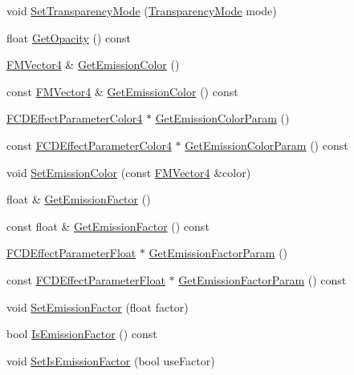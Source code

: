 \begin{DoxyCompactItemize}
\item 
void \hyperlink{classFCDEffectStandard_a486d7ddb1801ed110c40b7b8ece29794}{SetTransparencyMode} (\hyperlink{classFCDEffectStandard_a9e749ea44e9152c5671985b3e9a7c9a5}{TransparencyMode} mode)
\item 
float \hyperlink{classFCDEffectStandard_ae10a18d9f1c10bfd334bb914b6c664e4}{GetOpacity} () const 
\item 
\hyperlink{classFMVector4}{FMVector4} \& \hyperlink{classFCDEffectStandard_a5995a932d71c056adf95c3ac21568d52}{GetEmissionColor} ()
\item 
const \hyperlink{classFMVector4}{FMVector4} \& \hyperlink{classFCDEffectStandard_aed08c475e5e46cfc37bfe25127b9b299}{GetEmissionColor} () const 
\item 
\hyperlink{classFCDEffectParameterAnimatableT}{FCDEffectParameterColor4} $\ast$ \hyperlink{classFCDEffectStandard_ad302349aad357e6c6335e794bc583ae0}{GetEmissionColorParam} ()
\item 
const \hyperlink{classFCDEffectParameterAnimatableT}{FCDEffectParameterColor4} $\ast$ \hyperlink{classFCDEffectStandard_ae104c6a2552283803cb7642fc9a9793d}{GetEmissionColorParam} () const 
\item 
void \hyperlink{classFCDEffectStandard_a7c0cf1aef71af0350675d32a3b179b4b}{SetEmissionColor} (const \hyperlink{classFMVector4}{FMVector4} \&color)
\item 
float \& \hyperlink{classFCDEffectStandard_aa0c497d8985dfd39f9a0b31ce0e61d90}{GetEmissionFactor} ()
\item 
const float \& \hyperlink{classFCDEffectStandard_aa8b817f9737206608e87ef4ea1f9c3f8}{GetEmissionFactor} () const 
\item 
\hyperlink{classFCDEffectParameterAnimatableT}{FCDEffectParameterFloat} $\ast$ \hyperlink{classFCDEffectStandard_a0c99ef6f5a48cabe5ad756002b2b5292}{GetEmissionFactorParam} ()
\item 
const \hyperlink{classFCDEffectParameterAnimatableT}{FCDEffectParameterFloat} $\ast$ \hyperlink{classFCDEffectStandard_a39b92132f40f484cf872da1479914ae5}{GetEmissionFactorParam} () const 
\item 
void \hyperlink{classFCDEffectStandard_a8bcef4fb2c27fc2e93d584b737666ad2}{SetEmissionFactor} (float factor)
\item 
bool \hyperlink{classFCDEffectStandard_a45c0775d6da7ed652eaf36bd40bdc4cf}{IsEmissionFactor} () const 
\item 
void \hyperlink{classFCDEffectStandard_a33444405bd0753a8fc45e1104c291b7d}{SetIsEmissionFactor} (bool useFactor)

\end{DoxyCompactItemize}
